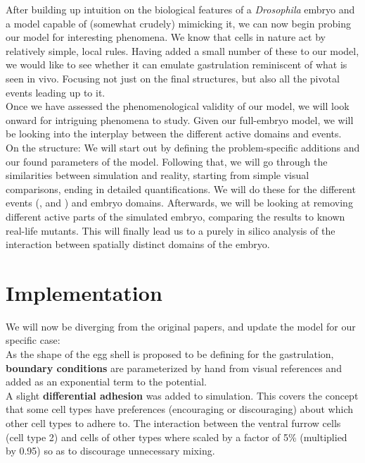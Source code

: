 After building up intuition on the biological features of a \textit{Drosophila} embryo and a model capable of (somewhat crudely) mimicking it, we can now begin probing our model for interesting phenomena. We know that cells in nature act by relatively simple, local rules. Having added a small number of these to our model, we would like to see whether it can emulate gastrulation reminiscent of what is seen in vivo. Focusing not just on the final structures, but also all the pivotal events leading up to it. \\

Once we have assessed the phenomenological validity of our model, we will look onward for intriguing phenomena to study. Given our full-embryo model, we will be looking into the interplay between the different active domains and events.\\


On the structure: We will start out by defining the problem-specific additions and our found parameters of the model. Following that, we will go through the similarities between simulation and reality, starting from simple visual comparisons, ending in detailed quantifications. We will do these for the different events (,  and ) and embryo domains. Afterwards, we will be looking at removing different active parts of the simulated embryo, comparing the results to known real-life mutants. This will finally lead us to a purely in silico analysis of the interaction between spatially distinct domains of the embryo.\\ 



\newpage
\section{Implementation}

We will now be diverging from the original papers, and update the model for our specific case:\\

As the shape of the egg shell is proposed to be defining for the gastrulation, \textbf{boundary conditions} are parameterized by hand from visual references and added as an exponential term to the potential.\\

A slight \textbf{differential adhesion} was added to simulation. This covers the concept that some cell types have preferences (encouraging or discouraging) about which other cell types to adhere to.
The interaction between the ventral furrow cells (cell type 2) and cells of other types where scaled by a factor of 5\% (multiplied by 0.95) so as to discourage unnecessary mixing.\\

